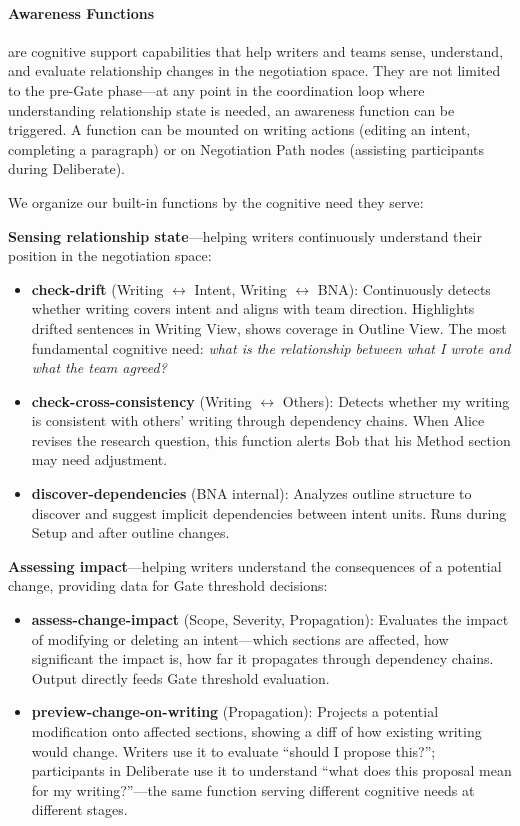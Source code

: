 \paragraph{Awareness Functions} are cognitive support capabilities that help writers and teams sense, understand, and evaluate relationship changes in the negotiation space. They are not limited to the pre-Gate phase---at any point in the coordination loop where understanding relationship state is needed, an awareness function can be triggered. A function can be mounted on writing actions (editing an intent, completing a paragraph) or on Negotiation Path nodes (assisting participants during Deliberate).

We organize our built-in functions by the cognitive need they serve:

\textbf{Sensing relationship state}---helping writers continuously understand their position in the negotiation space:
\begin{itemize}[leftmargin=1.5em, itemsep=1pt]
\item \textbf{check-drift} (Writing $\leftrightarrow$ Intent, Writing $\leftrightarrow$ BNA): Continuously detects whether writing covers intent and aligns with team direction. Highlights drifted sentences in Writing View, shows coverage in Outline View. The most fundamental cognitive need: \emph{what is the relationship between what I wrote and what the team agreed?}
\item \textbf{check-cross-consistency} (Writing $\leftrightarrow$ Others): Detects whether my writing is consistent with others' writing through dependency chains. When Alice revises the research question, this function alerts Bob that his Method section may need adjustment.
\item \textbf{discover-dependencies} (BNA internal): Analyzes outline structure to discover and suggest implicit dependencies between intent units. Runs during Setup and after outline changes.
\end{itemize}

\textbf{Assessing impact}---helping writers understand the consequences of a potential change, providing data for Gate threshold decisions:
\begin{itemize}[leftmargin=1.5em, itemsep=1pt]
\item \textbf{assess-change-impact} (Scope, Severity, Propagation): Evaluates the impact of modifying or deleting an intent---which sections are affected, how significant the impact is, how far it propagates through dependency chains. Output directly feeds Gate threshold evaluation.
\item \textbf{preview-change-on-writing} (Propagation): Projects a potential modification onto affected sections, showing a diff of how existing writing would change. Writers use it to evaluate ``should I propose this?''; participants in Deliberate use it to understand ``what does this proposal mean for my writing?''---the same function serving different cognitive needs at different stages.
\end{itemize}

